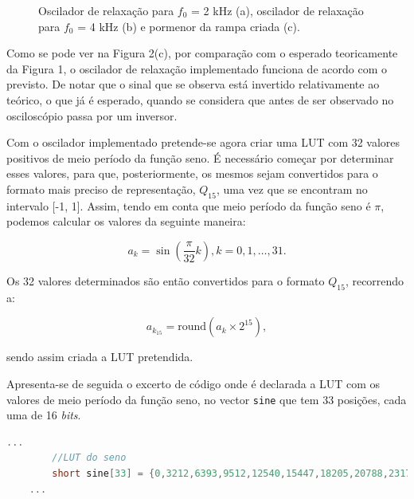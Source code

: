 \documentclass[11pt]{article}
\numberwithin{equation}{section}
\begin{document}
\begin{figure}[H]
	\vspace{-0.8em}
	\caption{Oscilador de relaxação para $f_{0}$ = 2 kHz (a), oscilador de relaxação para $f_{0}$ = 4 kHz (b) e pormenor da rampa criada (c).}
	\vspace{-0.8em}
\end{figure}

Como se pode ver na Figura 2(c), por comparação com o esperado teoricamente da Figura 1, o oscilador de relaxação implementado funciona de acordo com o previsto. De notar que o sinal que se observa está invertido relativamente ao teórico, o que já é esperado, quando se considera que antes de ser observado no osciloscópio passa por um inversor.

Com o oscilador implementado pretende-se agora criar uma LUT com 32 valores positivos de meio período da função seno. É necessário começar por determinar esses valores, para que, posteriormente, os mesmos sejam convertidos para o formato mais preciso de representação, $Q_{15}$, uma vez que se encontram no intervalo [-1, 1]. Assim, tendo em conta que meio período da função seno é $\pi$, podemos calcular os valores da seguinte maneira:

\vspace{-3mm}
\begin{equation}
a_{k} = \sin \left( \frac{\pi}{32}k \right), k = 0, 1, \ldots, 31.
\end{equation}

\vspace{1mm}
Os 32 valores determinados são então convertidos para o formato $Q_{15}$, recorrendo a:

\vspace{-3mm}
\begin{equation}
a_{k_{15}} = \text{round}\left(a_{k} \times 2^{15} \right),
\end{equation} 

\vspace{1mm}
sendo assim criada a LUT pretendida.

Apresenta-se de seguida o excerto de código onde é declarada a LUT com os valores de meio período da função seno, no vector \texttt{sine} que tem 33 posições, cada uma de 16 \textit{bits}. 

\begin{lstlisting}[language=C]
	...
		//LUT do seno
		short sine[33] = {0,3212,6393,9512,12540,15447,18205,20788,23170,25330,27246,28899,30274,31357,		32138,32610,32767,32610,32138,31357,30274,28899,27246,25330,23170,20788,18205,	15447,12540,9512,6393,3212,0}; 
	...
\end{lstlisting}
\end{document}
